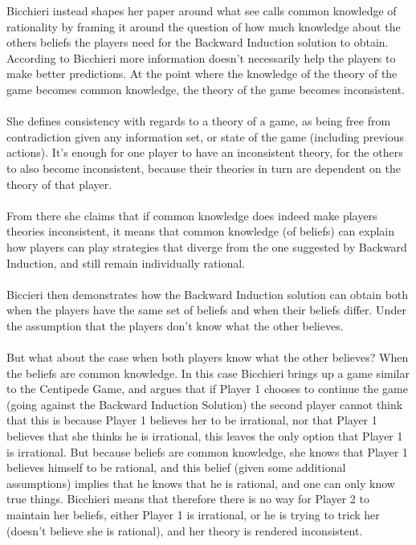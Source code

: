\documentclass{article}
\begin{document}
Bicchieri instead shapes her paper around what see calls common knowledge of rationality by framing it around the question of how much knowledge about the others beliefs the players need for the Backward Induction solution to obtain. According to Bicchieri more information doesn't necessarily help the players to make better predictions. At the point where the knowledge of the theory of the game becomes common knowledge, the theory of the game becomes inconsistent.
\\
\\
She defines consistency with regards to a theory of a game, as being free from contradiction given any information set, or state of the game (including previous actions). It's enough for one player to have an inconsistent theory, for the others to also become inconsistent, because their theories in turn are dependent on the theory of that player.
\\
\\
From there she claims that if common knowledge does indeed make players theories inconsistent, it means that common knowledge (of beliefs) can explain how players can play strategies that diverge from the one suggested by Backward Induction, and still remain individually rational.
\\
\\
Biccieri then demonstrates how the Backward Induction solution can obtain both when the players have the same set of beliefs and when their beliefs differ. Under the assumption that the players don't know what the other believes.
\\
\\
But what about the case when both players know what the other believes? When the beliefs are common knowledge. In this case Bicchieri brings up a game similar to the Centipede Game, and argues that if Player 1 chooses to continue the game (going against the Backward Induction Solution) the second player cannot think that this is because Player 1 believes her to be irrational, nor that Player 1 believes that she thinks he is irrational, this leaves the only option that Player 1 is irrational. But because beliefs are common knowledge, she knows that Player 1 believes himself to be rational, and this belief (given some additional assumptions) implies that he knows that he is rational, and one can only know true things. Bicchieri means that therefore there is no way for Player 2 to maintain her beliefs, either Player 1 is irrational, or he is trying to trick her (doesn't believe she is rational), and her theory is rendered inconsistent. 
\end{document}
